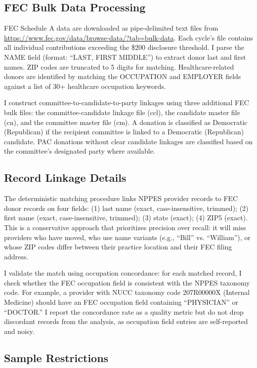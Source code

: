 \documentclass[12pt]{article}
\begin{document}
\subsection{FEC Bulk Data Processing}

FEC Schedule A data are downloaded as pipe-delimited text files from \url{https://www.fec.gov/data/browse-data/?tab=bulk-data}. Each cycle's file contains all individual contributions exceeding the \$200 disclosure threshold. I parse the NAME field (format: ``LAST, FIRST MIDDLE'') to extract donor last and first names. ZIP codes are truncated to 5 digits for matching. Healthcare-related donors are identified by matching the OCCUPATION and EMPLOYER fields against a list of 30+ healthcare occupation keywords.

I construct committee-to-candidate-to-party linkages using three additional FEC bulk files: the committee-candidate linkage file (ccl), the candidate master file (cn), and the committee master file (cm). A donation is classified as Democratic (Republican) if the recipient committee is linked to a Democratic (Republican) candidate. PAC donations without clear candidate linkages are classified based on the committee's designated party where available.

\subsection{Record Linkage Details}

The deterministic matching procedure links NPPES provider records to FEC donor records on four fields: (1) last name (exact, case-insensitive, trimmed); (2) first name (exact, case-insensitive, trimmed); (3) state (exact); (4) ZIP5 (exact). This is a conservative approach that prioritizes precision over recall: it will miss providers who have moved, who use name variants (e.g., ``Bill'' vs. ``William''), or whose ZIP codes differ between their practice location and their FEC filing address.

I validate the match using occupation concordance: for each matched record, I check whether the FEC occupation field is consistent with the NPPES taxonomy code. For example, a provider with NUCC taxonomy code 207R00000X (Internal Medicine) should have an FEC occupation field containing ``PHYSICIAN'' or ``DOCTOR.'' I report the concordance rate as a quality metric but do not drop discordant records from the analysis, as occupation field entries are self-reported and noisy.

\subsection{Sample Restrictions}
\end{document}
